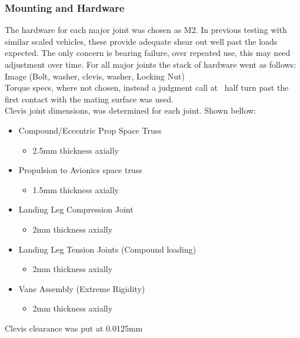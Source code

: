\documentclass[12pt,letterpaper]{article}
\begin{document}
\subsubsection{Mounting and Hardware}

The hardware for each major joint was chosen as M2. In previous testing with similar scaled vehicles, these provide adequate shear out well past the loads expected. The only concern is bearing failure, over repeated use, this may need adjustment over time. For all major joints the stack of hardware went as follows:\\
Image (Bolt, washer, clevis, washer, Locking Nut) \\

Torque specs, where not chosen, instead a judgment call at ~half turn past the first contact with the mating surface was used.\\

Clevis joint dimensions, was determined for each joint. Shown bellow:
\begin{itemize}
\item Compound/Eccentric Prop Space Truss
\begin{itemize}
\item 2.5\unit{\mm} thickness axially 
\end{itemize} 
\item Propulsion to Avionics space truss
\begin{itemize}
\item 1.5\unit{\mm} thickness axially
\end{itemize}
\item Landing Leg Compression Joint
\begin{itemize}
\item 2\unit{\mm} thickness axially
\end{itemize}
\item Landing Leg Tension Joints (Compound loading)
\begin{itemize}
\item 2\unit{\mm} thickness axially
\end{itemize}
\item Vane Assembly (Extreme Rigidity) 
\begin{itemize}
\item 2\unit{\mm} thickness axially 
\end{itemize}
\end{itemize}
Clevis clearance was put at 0.0125\unit{\mm}
\end{document}
